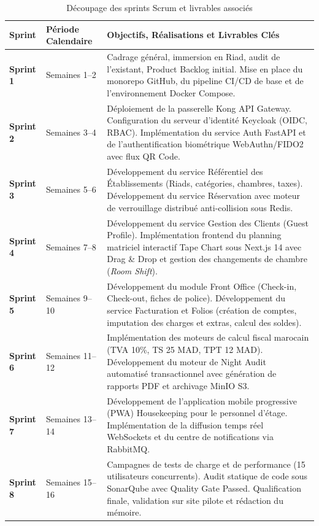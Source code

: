 \begin{table}[H]
\centering
\small
\renewcommand{\arraystretch}{1.3}
\begin{tabularx}{\textwidth}{|p{2.2cm}|p{3.2cm}|X|}
\hline
\textbf{Sprint} & \textbf{Période Calendaire} & \textbf{Objectifs, Réalisations et Livrables Clés} \\
\hline
\textbf{Sprint 1} & Semaines 1--2 & Cadrage général, immersion en Riad, audit de l'existant, Product Backlog initial. Mise en place du monorepo GitHub, du pipeline CI/CD de base et de l'environnement Docker Compose. \\
\hline
\textbf{Sprint 2} & Semaines 3--4 & Déploiement de la passerelle Kong API Gateway. Configuration du serveur d'identité Keycloak (OIDC, RBAC). Implémentation du service Auth FastAPI et de l'authentification biométrique WebAuthn/FIDO2 avec flux QR Code. \\
\hline
\textbf{Sprint 3} & Semaines 5--6 & Développement du service Référentiel des Établissements (Riads, catégories, chambres, taxes). Développement du service Réservation avec moteur de verrouillage distribué anti-collision sous Redis. \\
\hline
\textbf{Sprint 4} & Semaines 7--8 & Développement du service Gestion des Clients (Guest Profile). Implémentation frontend du planning matriciel interactif Tape Chart sous Next.js 14 avec Drag \& Drop et gestion des changements de chambre (\textit{Room Shift}). \\
\hline
\textbf{Sprint 5} & Semaines 9--10 & Développement du module Front Office (Check-in, Check-out, fiches de police). Développement du service Facturation et Folios (création de comptes, imputation des charges et extras, calcul des soldes). \\
\hline
\textbf{Sprint 6} & Semaines 11--12 & Implémentation des moteurs de calcul fiscal marocain (TVA 10\%, TS 25 MAD, TPT 12 MAD). Développement du moteur de Night Audit automatisé transactionnel avec génération de rapports PDF et archivage MinIO S3. \\
\hline
\textbf{Sprint 7} & Semaines 13--14 & Développement de l'application mobile progressive (PWA) Housekeeping pour le personnel d'étage. Implémentation de la diffusion temps réel WebSockets et du centre de notifications via RabbitMQ. \\
\hline
\textbf{Sprint 8} & Semaines 15--16 & Campagnes de tests de charge et de performance (15 utilisateurs concurrents). Audit statique de code sous SonarQube avec Quality Gate Passed. Qualification finale, validation sur site pilote et rédaction du mémoire. \\
\hline
\end{tabularx}
\caption{Découpage des sprints Scrum et livrables associés}
\label{tab:sprints_detail}
\end{table}

